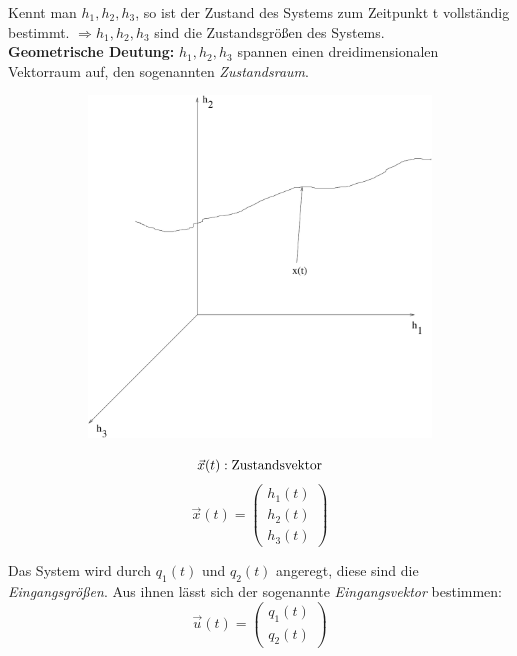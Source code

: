 \documentclass[12pt,a4paper,ngerman]{scrartcl}
\begin{document}
Kennt man $h_1,h_2,h_3$, so ist der Zustand des Systems zum Zeitpunkt t vollständig bestimmt. $\Rightarrow h_1,h_2,h_3$ sind die Zustandsgrößen des Systems.\\
\textbf{Geometrische Deutung:} $h_1,h_2,h_3$ spannen einen dreidimensionalen Vektorraum auf, den sogenannten \emph{Zustandsraum}.\\
\begin{figure}[H]
  \begin{minipage}{0.5\linewidth}
    \begin{figure}[H]
      \includegraphics[width=0.9\linewidth]{sysregel_zustandsraum}
    \end{figure}
  \end{minipage}
  \begin{minipage}{0.5\linewidth}
    \[\vec{x}(t): \text{Zustandsvektor}\\\]
    \[\vec{x}(t)=  \begin{pmatrix}
            h_1(t) \\
            h_2(t) \\
            h_3(t) \end{pmatrix} \] 
  \end{minipage}
\end{figure}
Das System wird durch $q_1(t)$ und $q_2(t)$ angeregt, diese sind die \emph{Eingangsgrößen}. Aus ihnen lässt sich der sogenannte \emph{Eingangsvektor} bestimmen:
\begin{equation*}
  \vec{u}(t)=\begin{pmatrix}
                            q_1(t)\\
                            q_2(t)
             \end{pmatrix}
\end{equation*}
\end{document}
